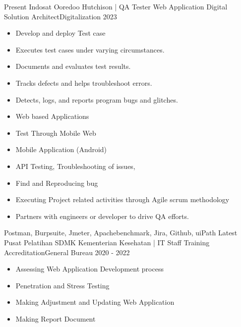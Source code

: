 
\begin{experiences}
  \experience
    {Present}   {Indosat Ooredoo Hutchison | QA Tester Web Application }{Digital Solution Architect}{Digitalization}
    {2023} {
                      \begin{itemize}
                        \item Develop and deploy Test case               
                        \item Executes test cases under varying circumstances.          
                        \item Documents and evaluates test results.        
                        \item Tracks defects and helps troubleshoot errors.
                        \item Detects, logs, and reports program bugs and glitches.
                        \item Web based Applications 
                        \item Test Through Mobile Web
                        \item Mobile Application (Android)
                        \item API Testing, Troubleshooting of issues, 
                        \item Find and Reproducing bug 
                        \item Executing Project related activities through Agile scrum methodology 
                        \item Partners with engineers or developer to drive QA efforts.                        
                      \end{itemize}
                    }
                    {Postman, Burpsuite, Jmeter, Apachebenchmark, Jira, Github, uiPath}
  \emptySeparator
  \experience
    {Latest}   {Pusat Pelatihan SDMK Kementerian Kesehatan | IT Staff }{Training Accreditation}{General Bureau}
    {2020 - 2022} {
                      \begin{itemize}
                        \item Assessing Web Application Development process                       
                        \item Penetration and Stress Testing                    
                        \item Making Adjustment and Updating Web Application               
                        \item Making Report Document                                                                   

\end{itemize}}
\end{experiences}
